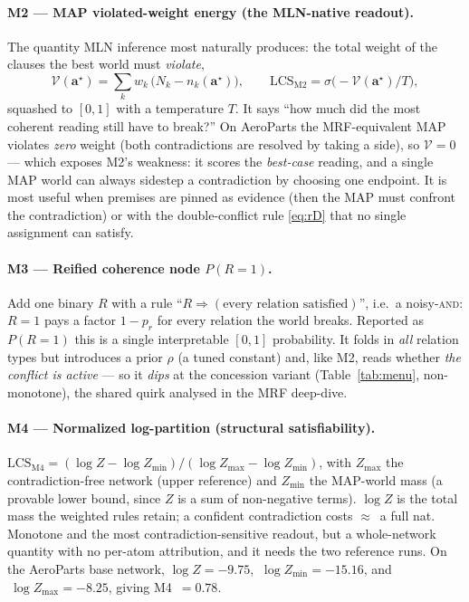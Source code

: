 \documentclass[11pt]{article}
\begin{document}
\paragraph{M2 --- MAP violated-weight energy (the MLN-native readout).}
The quantity MLN inference most naturally produces: the total weight of the clauses the best
world must \emph{violate},
\[
   \mathcal V(\mathbf a^\star)=\sum_k w_k\,\big(N_k-n_k(\mathbf a^\star)\big),
   \qquad
   \mathrm{LCS}_{\text{M2}}=\sigma\!\big(-\mathcal V(\mathbf a^\star)/T\big),
\]
squashed to $[0,1]$ with a temperature $T$. It says ``how much did the most coherent reading
still have to break?'' On AeroParts the MRF-equivalent MAP violates \emph{zero} weight
(both contradictions are resolved by taking a side), so $\mathcal V{=}0$ --- which exposes
M2's weakness: it scores the \emph{best-case} reading, and a single MAP world can always
sidestep a contradiction by choosing one endpoint. It is most useful when premises are pinned
as evidence (then the MAP must confront the contradiction) or with the double-conflict rule
\eqref{eq:rD} that no single assignment can satisfy.

\paragraph{M3 --- Reified coherence node $P(R{=}1)$.}
Add one binary $R$ with a rule ``$R\Rightarrow(\text{every relation satisfied})$'', i.e.\ a
noisy-\textsc{and}: $R{=}1$ pays a factor $1-p_r$ for every relation the world breaks. Reported as
$P(R{=}1)$ this is a single interpretable $[0,1]$ probability. It folds in \emph{all}
relation types but introduces a prior $\rho$ (a tuned constant) and, like M2, reads
whether \emph{the conflict is active} --- so it \emph{dips} at the concession variant
(Table~\ref{tab:menu}, non-monotone), the shared quirk analysed in the MRF deep-dive.

\paragraph{M4 --- Normalized log-partition (structural satisfiability).}
$\mathrm{LCS}_{\text{M4}}=(\log Z-\log Z_{\min})/(\log Z_{\max}-\log Z_{\min})$, with
$Z_{\max}$ the contradiction-free network (upper reference) and $Z_{\min}$ the MAP-world
mass (a provable lower bound, since $Z$ is a sum of non-negative terms). $\log Z$ is the
total mass the weighted rules retain; a confident contradiction costs $\approx$~a full nat.
Monotone and the most contradiction-sensitive readout, but a whole-network quantity with no
per-atom attribution, and it needs the two reference runs. On the AeroParts base network,
$\log Z=-9.75$, $\ \log Z_{\min}=-15.16$, and $\ \log Z_{\max}=-8.25$, giving M4~$=0.78$.
\end{document}
